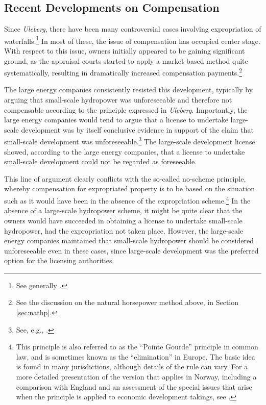 \subsection{Recent Developments on Compensation}

Since {\it Uleberg}, there have been many controversial cases involving expropriation of waterfalls.\footnote{See generally \cite{larsen06,larsen08,larsen12}.} In most of these, the issue of compensation has occupied center stage. %
With respect to this issue, owners initially appeared to be gaining significant ground, as the appraisal courts started to apply a market-based method quite systematically, resulting in dramatically increased compensation payments.\footnote{See the discussion on the natural horsepower method above, in Section \ref{sec:nathp}.}

The large energy companies consistently resisted this development, typically by arguing that small-scale hydropower was unforeseeable and therefore not compensable according to the principle expressed in {\it Uleberg}. Importantly, the large energy companies would tend to argue that a license to undertake large-scale development was by itself conclusive evidence in support of the claim that small-scale development was unforeseeable.\footnote{See, e.g., \cite[17]{otra10}.} The large-scale development license showed, according to the large energy companies, that a license to undertake small-scale development could not be regarded as foreseeable.

This line of argument clearly conflicts with the so-called no-scheme principle, whereby compensation for expropriated property is to be based on the situation such as it would have been in the absence of the expropriation scheme.\footnote{This principle is also referred to as the ``Pointe Gourde'' principle in common law, and is sometimes known as the ``elimination''  in Europe. The basic idea is found in many jurisdictions, although details of the rule can vary. For a more detailed presentation of the version that applies in Norway, including a comparison with England and an assessment of the special issues that arise when the principle is applied to economic development takings, see \cite{dyrkolbotn15}.} In the absence of a large-scale hydropower scheme, it might be quite clear that the owners would have succeeded in obtaining a license to undertake small-scale hydropower, had the expropriation not taken place. However, the large-scale energy companies maintained that small-scale hydropower should be considered unforeseeable even in these cases, since large-scale development was the preferred option for the licensing authorities.

